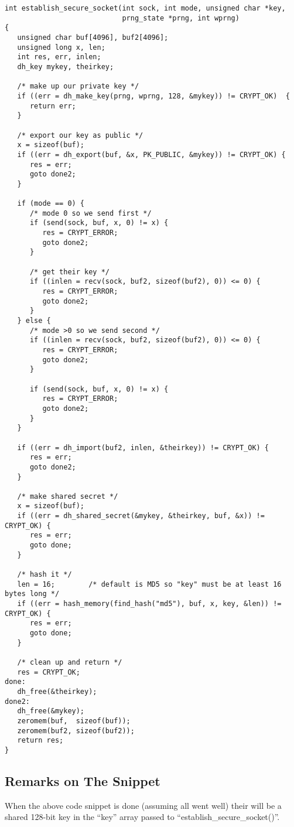 \documentclass[a4paper]{book}
\begin{document}
\begin{small}
\begin{verbatim}
int establish_secure_socket(int sock, int mode, unsigned char *key, 
                            prng_state *prng, int wprng)
{
   unsigned char buf[4096], buf2[4096];
   unsigned long x, len;
   int res, err, inlen;
   dh_key mykey, theirkey;

   /* make up our private key */
   if ((err = dh_make_key(prng, wprng, 128, &mykey)) != CRYPT_OK)  {
      return err;
   }

   /* export our key as public */ 
   x = sizeof(buf);
   if ((err = dh_export(buf, &x, PK_PUBLIC, &mykey)) != CRYPT_OK) {
      res = err;
      goto done2;
   }

   if (mode == 0) {
      /* mode 0 so we send first */
      if (send(sock, buf, x, 0) != x) {
         res = CRYPT_ERROR;
         goto done2;
      }          

      /* get their key */
      if ((inlen = recv(sock, buf2, sizeof(buf2), 0)) <= 0) {
         res = CRYPT_ERROR;
         goto done2;
      }
   } else {
      /* mode >0 so we send second */
      if ((inlen = recv(sock, buf2, sizeof(buf2), 0)) <= 0) {
         res = CRYPT_ERROR;
         goto done2;
      }

      if (send(sock, buf, x, 0) != x) {
         res = CRYPT_ERROR;
         goto done2;
      }
   }

   if ((err = dh_import(buf2, inlen, &theirkey)) != CRYPT_OK) { 
      res = err;
      goto done2;
   }

   /* make shared secret */
   x = sizeof(buf);
   if ((err = dh_shared_secret(&mykey, &theirkey, buf, &x)) != CRYPT_OK) {
      res = err;
      goto done;
   }
 
   /* hash it */
   len = 16;        /* default is MD5 so "key" must be at least 16 bytes long */
   if ((err = hash_memory(find_hash("md5"), buf, x, key, &len)) != CRYPT_OK) {
      res = err;
      goto done;
   }

   /* clean up and return */
   res = CRYPT_OK;
done:
   dh_free(&theirkey);
done2:
   dh_free(&mykey);
   zeromem(buf,  sizeof(buf));
   zeromem(buf2, sizeof(buf2));
   return res;
}
\end{verbatim}
\end{small}
\newpage
\subsection{Remarks on The Snippet}
When the above code snippet is done (assuming all went well) their will be a shared 128-bit key in the ``key'' array
passed to ``establish\_secure\_socket()''.
\end{document}
